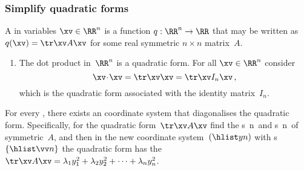 \begin{comment}
Should include classification of 3D surfaces, but write later. 
\end{comment}





\subsubsection{Simplify quadratic forms}


\begin{definition} \label{def:}
A  in variables \(\xv\in\RR^n\) is a function \(q:\RR^n\to\RR\) that may be written as \(q(\xv)=\tr\xv A\xv\) for some real symmetric \(n\times n\) matrix~\(A\).
\end{definition}

\begin{example} \label{eg:}
\begin{enumerate}
\item The dot product in~\(\RR^n\) is a quadratic form.
For all \(\xv\in\RR^n\) consider
\begin{equation*}
\xv\cdot\xv=\tr\xv\xv=\tr\xv I_n\xv\,,
\end{equation*}
which is the quadratic form associated with the identity matrix~\(I_n\).
\end{enumerate}
\end{example}


\begin{theorem} \label{thm:patqform}
For every , there exists an  coordinate system that diagonalises the quadratic form.
Specifically, for the quadratic form~\(\tr\xv A\xv\) find the s~\hlist\lambda n\ and  s~\hlist\vv n\ of symmetric~\(A\), and then in the new coordinate system~\((\hlist yn)\) with s \(\{\hlist\vv n\}\) the quadratic form has the  \(\tr\xv A\xv=\lambda_1y_1^2+\lambda_2y_2^2+\cdots+\lambda_ny_n^2\).
\end{theorem}

